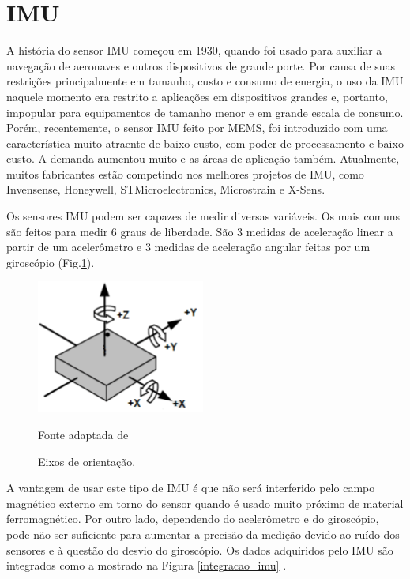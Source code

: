 \section{IMU}

A história do sensor IMU começou em 1930, quando foi usado para auxiliar a navegação de aeronaves e outros dispositivos de grande porte. Por causa de suas restrições principalmente em tamanho, custo e consumo de energia, o uso da IMU naquele momento era restrito a aplicações em dispositivos grandes e, portanto, impopular para equipamentos de tamanho menor e em grande escala de consumo. Porém, recentemente, o sensor IMU feito por MEMS, foi introduzido com uma característica muito atraente de baixo custo, com poder de processamento e baixo custo. A demanda aumentou muito e as áreas de aplicação também. Atualmente, muitos fabricantes estão competindo nos melhores projetos de IMU, como Invensense, Honeywell, STMicroelectronics, Microstrain e X-Sens\cite{ahmad2013}.

Os sensores IMU podem ser capazes de medir diversas variáveis. Os mais comuns são feitos para medir 6 graus de liberdade. São 3 medidas de aceleração linear a partir de um acelerômetro e 3 medidas de aceleração angular feitas por um giroscópio (Fig.\ref{eixos_imu})\cite{santos2016}.
 
\begin{figure}[h]
	\centering
	\includegraphics[keepaspectratio=true,scale=0.6
	]{figuras/Eixos_imu.png}
	\caption{Eixos de orientação.}
	Fonte adaptada de \cite{mpu6050}
	\label{eixos_imu}
	
\end{figure}


A vantagem de usar este tipo de IMU é que não será interferido pelo campo magnético externo em torno do
sensor quando é usado muito próximo de material ferromagnético. Por outro lado, dependendo do acelerômetro e do giroscópio, pode não ser suficiente para aumentar a precisão da medição devido ao ruído dos sensores e à questão do desvio do giroscópio. Os dados adquiridos pelo IMU são integrados como a mostrado na Figura \ref{integracao_imu} \cite{ahmad2013}.

